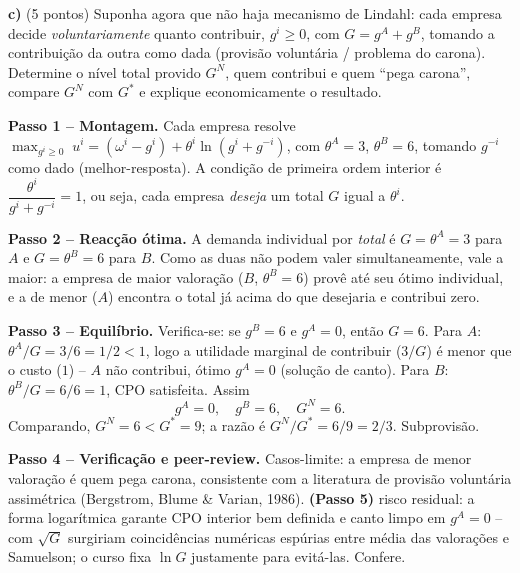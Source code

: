 \textbf{c)} (5 pontos) Suponha agora que n\~ao haja mecanismo de Lindahl: cada empresa decide \emph{voluntariamente} quanto contribuir, $g^i \ge 0$, com $G = g^A + g^B$, tomando a contribui\c{c}\~ao da outra como dada (provis\~ao volunt\'aria / problema do carona). Determine o n\'ivel total provido $G^N$, quem contribui e quem ``pega carona'', compare $G^N$ com $G^*$ e explique economicamente o resultado.
\resolucaobox{7.6cm}
\begin{solucao}
\textbf{Passo 1 -- Montagem.} Cada empresa resolve $\max_{g^i \ge 0} \; u^i = (\omega^i - g^i) + \theta^i \ln(g^i + g^{-i})$, com $\theta^A=3$, $\theta^B=6$, tomando $g^{-i}$ como dado (melhor-resposta). A condi\c{c}\~ao de primeira ordem interior \'e $\dfrac{\theta^i}{g^i + g^{-i}} = 1$, ou seja, cada empresa \emph{deseja} um total $G$ igual a $\theta^i$.

\textbf{Passo 2 -- Reac\c{c}\~ao \'otima.} A demanda individual por \emph{total} \'e $G = \theta^A = 3$ para $A$ e $G = \theta^B = 6$ para $B$. Como as duas n\~ao podem valer simultaneamente, vale a maior: a empresa de maior valora\c{c}\~ao ($B$, $\theta^B=6$) provê at\'e seu \'otimo individual, e a de menor ($A$) encontra o total j\'a acima do que desejaria e contribui zero.

\textbf{Passo 3 -- Equil\'ibrio.} Verifica-se: se $g^B = 6$ e $g^A = 0$, ent\~ao $G=6$. Para $A$: $\theta^A/G = 3/6 = 1/2 < 1$, logo a utilidade marginal de contribuir ($3/G$) \'e menor que o custo ($1$) -- $A$ n\~ao contribui, \'otimo $g^A=0$ (solu\c{c}\~ao de canto). Para $B$: $\theta^B/G = 6/6 = 1$, CPO satisfeita. Assim
\[ g^A = 0, \quad g^B = 6, \quad G^N = 6. \]
Comparando, $G^N = 6 < G^* = 9$; a raz\~ao \'e $G^N/G^* = 6/9 = 2/3$. Subprovis\~ao.

\textbf{Passo 4 -- Verifica\c{c}\~ao e peer-review.} Casos-limite: a empresa de menor valora\c{c}\~ao \'e quem pega carona, consistente com a literatura de provis\~ao volunt\'aria assim\'etrica (Bergstrom, Blume \& Varian, 1986). \textbf{(Passo 5)} risco residual: a forma logar\'itmica garante CPO interior bem definida e canto limpo em $g^A=0$ -- com $\sqrt{G}$ surgiriam coincid\^encias num\'ericas esp\'urias entre m\'edia das valora\c{c}\~oes e Samuelson; o curso fixa $\ln G$ justamente para evit\'a-las. Confere.


\end{solucao}
